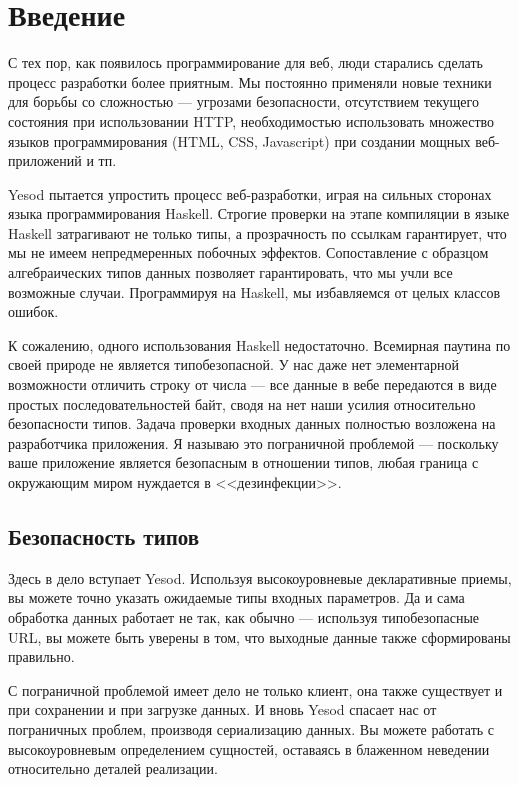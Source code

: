 \chapter{Введение}\label{chap:introduction}

С тех пор, как появилось программирование для веб, люди старались сделать процесс разработки более приятным. Мы постоянно применяли новые техники для борьбы со сложностью --- угрозами безопасности, отсутствием текущего состояния при использовании HTTP, необходимостью использовать множество языков программирования (HTML, CSS, Javascript) при создании мощных веб-приложений и тп.

Yesod пытается упростить процесс веб-разработки, играя на сильных сторонах языка программирования Haskell. Строгие проверки на этапе компиляции в языке Haskell затрагивают не только типы, а прозрачность по ссылкам гарантирует, что мы не имеем непредмеренных побочных эффектов. Сопоставление с образцом алгебраических типов данных позволяет гарантировать, что мы учли все возможные случаи. Программируя на Haskell, мы избавляемся от целых классов ошибок.

К сожалению, одного использования Haskell недостаточно. Всемирная паутина по своей природе не является типобезопасной. У нас даже нет элементарной возможности отличить строку от числа --- все данные в вебе передаются в виде простых последовательностей байт, сводя на нет наши усилия относительно безопасности типов. Задача проверки входных данных полностью возложена на разработчика приложения. Я называю это пограничной проблемой --- поскольку ваше приложение является безопасным в отношении типов, любая граница с окружающим миром нуждается в <<дезинфекции>>.

\section{Безопасность типов}

Здесь в дело вступает Yesod. Используя высокоуровневые декларативные приемы, вы можете точно указать ожидаемые типы входных параметров. Да и сама обработка данных работает не так, как обычно --- используя типобезопасные URL, вы можете быть уверены в том, что выходные данные также сформированы правильно.

С пограничной проблемой имеет дело не только клиент, она также существует и при сохранении и при загрузке данных. И вновь Yesod спасает нас от пограничных проблем, производя сериализацию данных. Вы можете работать с высокоуровневым определением сущностей, оставаясь в блаженном неведении относительно деталей реализации.

